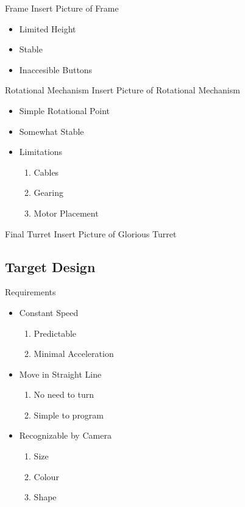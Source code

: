 \begin{frame}{Frame}
Insert Picture of Frame
\begin{itemize}
	\item Limited Height
	\item Stable
	\item Inaccesible Buttons
\end{itemize}
\end{frame}

\begin{frame}{Rotational Mechanism}
Insert Picture of Rotational Mechanism
\begin{itemize}
    \item Simple Rotational Point 
	\item Somewhat Stable
	\item Limitations
		\begin{enumerate}
  			\item Cables
  			\item Gearing
  			\item Motor Placement
		\end{enumerate}
\end{itemize}
\end{frame}

\begin{frame}{Final Turret}
Insert Picture of Glorious Turret
\end{frame}

\subsection{Target Design}
\begin{frame}{Requirements}
\begin{itemize}
    \item Constant Speed
    	\begin{enumerate}
    	    \item Predictable 
  			\item Minimal Acceleration
		\end{enumerate}
    \item Move in Straight Line
    	\begin{enumerate}
  			\item No need to turn
  			\item Simple to program
		\end{enumerate}
    \item Recognizable by Camera
    	\begin{enumerate}
  			\item Size
  			\item Colour
  			\item Shape
		\end{enumerate}
\end{itemize}
\end{frame}

